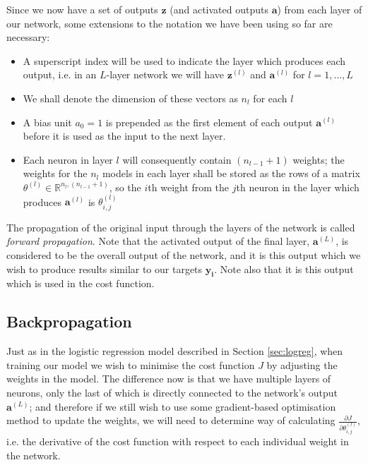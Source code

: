 \documentclass{article}[11pt]
\begin{document}
        Since we now have a set of outputs $\mathbf{z}$ (and activated outputs $\mathbf{a}$) from each layer of our network, some extensions to the notation we have been using so far are necessary:
        
        \begin{itemize}
            
            \item A superscript index will be used to indicate the layer which produces each output, i.e. in an $L$-layer network we will have $\mathbf{z}^{(l)}$ and $\mathbf{a}^{(l)}$ for $l = 1, \ldots, L$
            
            \item We shall denote the dimension of these vectors as $n_l$ for each $l$
            
            \item A bias unit $a_0 = 1$ is prepended as the first element of each output $\mathbf{a}^{(l)}$ before it is used as the input to the next layer.
            
            \item Each neuron in layer $l$ will consequently contain $(n_{l-1} + 1)$ weights; the weights for the $n_l$ models in each layer shall be stored as the rows of a matrix $\theta^{(l)} \in \mathbb{R}^{n_l, (n_{l-1}+1)}$, so the $i$th weight from the $j$th neuron in the layer which produces $\mathbf{a}^{(l)}$ is $\theta^{(l)}_{i,j}$
        
        \end{itemize}
        
        The propagation of the original input through the layers of the network is called \textit{forward propagation}. Note that the activated output of the final layer, $\mathbf{a}^{(L)}$, is considered to be the overall output of the network, and it is this output which we wish to produce results similar to our targets $\mathbf{y_i}$. Note also that it is this output which is used in the cost function.
        
        
        

    \subsection{Backpropagation}
        
        Just as in the logistic regression model described in Section \ref{sec:logreg}, when training our model we wish to minimise the cost function $J$ by adjusting the weights in the model. The difference now is that we have multiple layers of neurons, only the last of which is directly connected to the network's output $\mathbf{a}^{(L)}$; and therefore if we still wish to use some gradient-based optimisation method to update the weights, we will need to determine way of calculating $\frac{\partial J}{\partial \theta^{(l)}_{i,j}}$, i.e. the derivative of the cost function with respect to each individual weight in the network.
        
\end{document}
